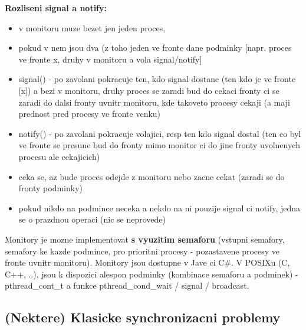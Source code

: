 \documentclass[a4paper, 11pt]{article}
\begin{document}
\textbf{Rozliseni signal a notify:}
\begin{itemize}
    \item v monitoru muze bezet jen jeden proces,
    \item pokud v nem jsou dva (z toho jeden ve fronte dane podminky [napr. proces ve fronte x, druhy v monitoru a vola signal/notify]
    \item signal() - po zavolani pokracuje ten, kdo signal dostane (ten kdo je ve fronte [x]) a bezi v monitoru, druhy proces se zaradi bud do cekaci fronty ci se zaradi do dalsi fronty uvnitr monitoru, kde takoveto procesy cekaji (a maji prednost pred procesy ve fronte venku)
    \item notify() - po zavolani pokracuje volajici, resp ten kdo signal dostal (ten co byl ve fronte se presune bud do fronty mimo monitor ci do jine fronty uvolnenych procesu ale cekajicich)
    \item ceka se, az bude proces odejde z monitoru nebo zacne cekat (zaradi se do fronty podminky)
    \item pokud nikdo na podmince neceka a nekdo na ni pouzije signal ci notify, jedna se o prazdnou operaci (nic se neprovede) \\
\end{itemize}

Monitory je mozne implementovat \textbf{s vyuzitim semaforu} (vstupni semafory, semafory ke kazde podmince, pro prioritni procesy - pozastavene procesy ve fronte uvnitr monitoru). Monitory jsou dostupne v Jave ci C\#. V POSIXu (C, C++, ..), jsou k dispozici alespon podminky (kombinace semaforu a podminek) - pthread\_cont\_t a funkce pthread\_cond\_wait / signal / broadcast. \\

\newpage

\subsection{(Nektere) Klasicke synchronizacni problemy}
\end{document}
